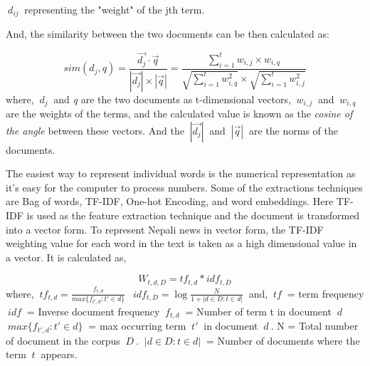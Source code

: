 \documentclass[12pt]{report}
\begin{document}
        $~{d_{ij}}~$ representing the "weight" of the jth term\cite{salton1975vector}.

        And, the similarity between the two documents can be then calculated as:
       
            \begin{equation}
                  sim(d_j, q) =  \frac{  \vec{d_j} \cdot \vec{q}  } {|\vec{d_j}|  \times |\vec{q}|  }   
                = \frac{\sum_{i=1}^{t}w_{i,j}\times w_{i,q}} {\sqrt{\sum_{i=1}^{t}w_{i,q}^2} \times \sqrt{\sum_{i=1}^{t}w_{i,j}^2}}
            \end{equation}
            where, \textit{$~{d_j}~$} and \emph{q} are the two documents as t-dimensional vectors, $~{w_{i,j}}~$ and $~{w_{i,q}}~$ are the weights of the terms, and the calculated value is known 
            as the \emph{cosine of the angle} between these vectors\cite{baeza1999modern}. And the $~{|\vec{d_j}|}~$ and $~{|\vec{q}|}~$ are the norms of the documents.
        
            The easiest way to represent individual words is the numerical representation as it's easy for the computer to process numbers. Some of 
        the extractions techniques are Bag of words, TF-IDF, One-hot Encoding, and word embeddings. 
        Here TF-IDF\cite{schutze2008introduction} is used as the feature extraction technique and the document is transformed into a vector form.
        To represent Nepali news in vector form, the TF-IDF weighting value for each word in the text is taken as a high dimensional
        value in a vector. It is calculated as, 

        \begin{equation} W_{t, d, D} = tf_{t, d} * idf_{t, D} \end{equation}  
         where,\newline
        $~{tf_{t, d} = \frac{f_{t,d}}{max\{f_{t', d} : t' \in d\}}}~$ \newline
        $~{idf_{t, D} = \log \frac{N}{1+  | {d \in D: t \in d}  |}}~$ \newline
            and,\newline
        $~{tf}~$ = term frequency\newline
        $~{idf}~$ = Inverse document frequency\newline
        $~{f_{t,d}}~$ = Number of term t in document $~{d}~$\newline
        $~{max\{f_{t', d} : t' \in d\} }~$ = max occurring term $~{t'}~$ in document $~{d}~$.\newline
        N = Total number of document in the corpus $~{D}~$.\newline
        $~{|{d \in D: t \in d}|}~$ = Number of documents where the term $~{t}~$ appears. \newline
\end{document}
